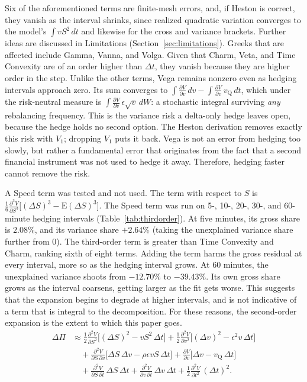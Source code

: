 \documentclass[11pt]{article}
\begin{document}
Six of the aforementioned terms are finite-mesh errors, and, if Heston is correct, they vanish as the interval shrinks, since realized quadratic variation converges to the model's $\int v S^2\,dt$ and likewise for the cross and variance brackets. Further ideas are discussed in Limitations (Section~\ref{sec:limitations}).
Greeks that are affected include Gamma, Vanna, and Volga.
Given that Charm, Veta, and Time Convexity are of an order higher than $\Delta t$, they vanish because they are higher order in the step.
Unlike the other terms, Vega remains nonzero even as hedging intervals approach zero.
Its sum converges to $\int \frac{\partial V}{\partial v}\,dv - \int \frac{\partial V}{\partial v}\,v_{\mathrm{Q}}\,dt$, which under the risk-neutral measure is $\int \frac{\partial V}{\partial v}\,\epsilon\sqrt{v}\,dW$: a stochastic integral surviving \emph{any} rebalancing frequency.
This is the variance risk a delta-only hedge leaves open, because the hedge holds no second option.
The Heston derivation removes exactly this risk with $V_1$; dropping $V_1$ puts it back.
Vega is not an error from hedging too slowly, but rather a fundamental error that originates from the fact that a second financial instrument was not used to hedge it away. Therefore, hedging faster cannot remove the risk.

A Speed term was tested and not used.
The term with respect to $S$ is $\frac{1}{6} \frac{\partial^3 V}{\partial S^3}\big[(\Delta S)^3 - \mathrm{E}(\Delta S)^3\big]$.
The Speed term was run on 5-, 10-, 20-, 30-, and 60-minute hedging intervals (Table~\ref{tab:thirdorder}).
At five minutes, its gross share is $2.08\%$, and its variance share $+2.64\%$ (taking the unexplained variance share further from 0).
The third-order term is greater than Time Convexity and Charm, ranking sixth of eight terms.
Adding the term harms the gross residual at every interval, more so as the hedging interval grows.
At 60 minutes, the unexplained variance shoots from $-12.70\%$ to $-39.43\%$.
Its own gross share grows as the interval coarsens, getting larger as the fit gets worse.
This suggests that the expansion begins to degrade at higher intervals, and is not indicative of a term that is integral to the decomposition.
For these reasons, the second-order expansion is the extent to which this paper goes.
\begin{align*}
\Delta\Pi &\approx \frac{1}{2} \frac{\partial^2 V}{\partial S^2}\big[ (\Delta S)^2 - v S^2\,\Delta t \big]
+ \frac{1}{2} \frac{\partial^2 V}{\partial v^2}\big[ (\Delta v)^2 - \epsilon^2 v\,\Delta t \big] \\
&\quad {} + \frac{\partial^2 V}{\partial S\,\partial v}\big[ \Delta S\,\Delta v - \rho \epsilon v S\,\Delta t \big]
+ \frac{\partial V}{\partial v}\big[ \Delta v - v_{\mathrm{Q}}\,\Delta t \big] \\
&\quad {} + \frac{\partial^2 V}{\partial S\,\partial t}\,\Delta S\,\Delta t
+ \frac{\partial^2 V}{\partial v\,\partial t}\,\Delta v\,\Delta t
+ \frac{1}{2} \frac{\partial^2 V}{\partial t^2}\,(\Delta t)^2 .
\end{align*}
\end{document}
